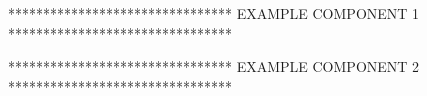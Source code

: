 \documentclass[11pt, letterpaper]{article}
\begin{document}
\draft



%
%
%
%

%
\newcommand\componentname{\textcolor{black}{\textbf{HOLD}}}  
%
%
%

	********************************
	EXAMPLE COMPONENT 1
	********************************

%
	********************************
	EXAMPLE COMPONENT 2
	********************************

%
%
%
%
%
%
%
%
%
%
%
%
%




%

%

\doPrintGloss

\newpage\label{mylastpage}
\end{document}
